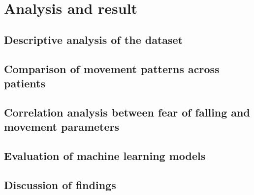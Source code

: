 \chapter{Analysis and result}
    \section{Descriptive analysis of the dataset}
    \section{Comparison of movement patterns across patients}
    \section{Correlation analysis between fear of falling and movement parameters}
    \section{Evaluation of machine learning models}
    \section{Discussion of findings}